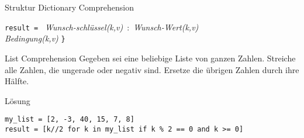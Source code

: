 \begin{frame}
\begin{block}{Struktur Dictionary Comprehension}	
\vspace{2pt}

\texttt{result = }
\pause {\Large\texttt{\{}}
\pause\textit{Wunsch-schlüssel(k,v)} 
\pause \,:\,
\pause  \textit{Wunsch-Wert(k,v)}  \\
\phantom{result = Klammer  }
\pause {} 
\pause {} 
\pause {} 
\pause {} 
\pause {} 
\pause \textit{Bedingung(k,v)}
\pause \Large{\texttt{\}}}

\end{block}

\end{frame}



\begin{fragile}[Übung]

\begin{block}{List Comprehension}
\vspace{2pt}
Gegeben sei eine beliebige Liste von ganzen Zahlen. Streiche alle Zahlen, die ungerade oder negativ sind. Ersetze die übrigen Zahlen durch ihre Hälfte. 
\end{block}


\vspace{12pt}

\begin{solutionblock}{Lösung}
\begin{verbatim}
my_list = [2, -3, 40, 15, 7, 8]
result = [k//2 for k in my_list if k % 2 == 0 and k >= 0]
\end{verbatim}
\end{solutionblock}

\end{fragile}


